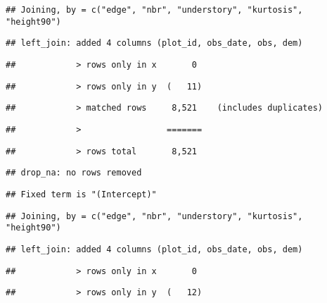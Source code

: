 \documentclass[
]{article}
\begin{document}
\begin{verbatim}
## Joining, by = c("edge", "nbr", "understory", "kurtosis", "height90")
\end{verbatim}

\begin{verbatim}
## left_join: added 4 columns (plot_id, obs_date, obs, dem)
\end{verbatim}

\begin{verbatim}
##            > rows only in x       0
\end{verbatim}

\begin{verbatim}
##            > rows only in y  (   11)
\end{verbatim}

\begin{verbatim}
##            > matched rows     8,521    (includes duplicates)
\end{verbatim}

\begin{verbatim}
##            >                 =======
\end{verbatim}

\begin{verbatim}
##            > rows total       8,521
\end{verbatim}

\begin{verbatim}
## drop_na: no rows removed
\end{verbatim}

\begin{verbatim}
## Fixed term is "(Intercept)"
\end{verbatim}

\begin{verbatim}
## Joining, by = c("edge", "nbr", "understory", "kurtosis", "height90")
\end{verbatim}

\begin{verbatim}
## left_join: added 4 columns (plot_id, obs_date, obs, dem)
\end{verbatim}

\begin{verbatim}
##            > rows only in x       0
\end{verbatim}

\begin{verbatim}
##            > rows only in y  (   12)
\end{verbatim}
\end{document}
